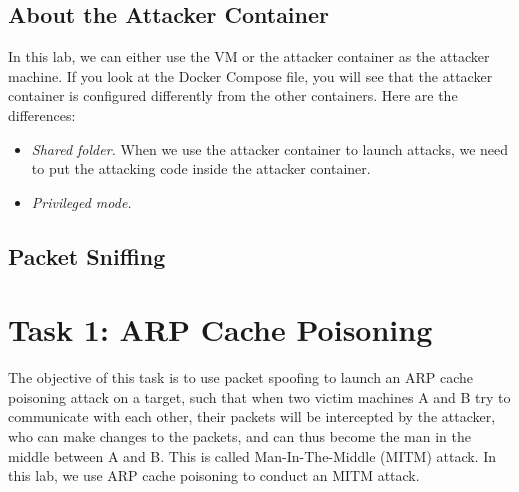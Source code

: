 


\subsection{About the Attacker Container}

In this lab, we can either use the VM or the attacker container
as the attacker machine. If you look at the Docker Compose file, you will
see that the attacker container is configured differently from the other
containers. Here are the differences:

\begin{itemize}
\item \textit{Shared folder.} When we use the attacker container
to launch attacks, we need to put the attacking code inside
the attacker container.


\item \textit{Privileged mode.}


\end{itemize}


\subsection{Packet Sniffing} 





\section{Task 1: ARP Cache Poisoning}


The objective of this task is to use packet spoofing to launch an ARP cache poisoning attack on
a target, such that when two victim machines A and B try to communicate with each other, their
packets will be intercepted by the attacker, who can make changes to the packets, and can thus
become the man in the middle between A and B. This is called Man-In-The-Middle (MITM) attack.
In this lab, we use ARP cache poisoning to conduct an MITM attack. 



